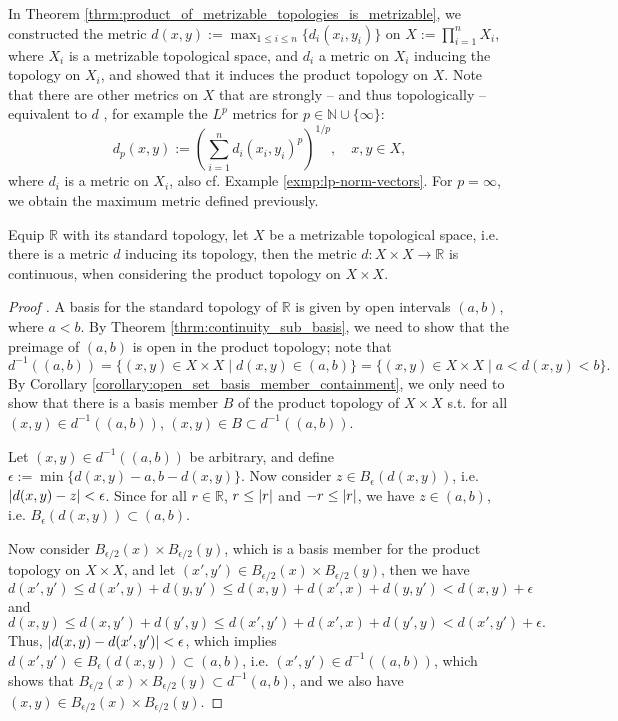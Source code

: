 \begin{remark}
	In Theorem \ref{thrm:product_of_metrizable_topologies_is_metrizable}, we constructed the metric $d(x, y) := \max_{1\leq i\leq n}\{d_i(x_i, y_i)\}$ on $X := \prod_{i=1}^{n}X_i$, where $X_i$ is a metrizable topological space, and $d_i$ a metric on $X_i$ inducing the topology on $X_i$, and showed that it induces the product topology on $X$. Note that there are other metrics on $X$ that are strongly -- and thus topologically -- equivalent to $d$ \cite{src:product_topology}, for example the $L^p$ metrics for $p\in \mathbb N\cup \{\infty\}$:
	$$d_p(x, y) := \left(\sum_{i=1}^{n}d_i(x_i, y_i)^p\right)^{1/p}, \quad x, y\in X,$$
	where $d_i$ is a metric on $X_i$, also cf. Example \ref{exmp:lp-norm-vectors}. For $p = \infty$, we obtain the maximum metric defined previously.
\end{remark}

\begin{theorem}
	Equip $\mathbb R$ with its standard topology, let $X$ be a metrizable topological space, i.e. there is a metric $d$ inducing its topology, then the metric $d: X\times X\to \mathbb R$ is continuous, when considering the product topology on $X\times X$.
\end{theorem}

\begin{proof}[Proof \cite{287313, 4228334}]
	A basis for the standard topology of $\mathbb R$ is given by open intervals $(a, b)$, where $a < b$. By Theorem \ref{thrm:continuity_sub_basis}, we need to show that the preimage of $(a, b)$ is open in the product topology; note that
	$$d^{-1}((a, b)) = \{(x, y)\in X\times X\mid d(x, y)\in (a, b)\} = \{(x, y)\in X\times X\mid a < d(x, y) < b\}.$$
	By Corollary \ref{corollary:open_set_basis_member_containment}, we only need to show that there is a basis member $B$ of the product topology of $X \times X$ s.t. for all $(x, y)\in d^{-1}((a, b))$, $(x, y)\in B\subset d^{-1}((a, b))$.
	
	Let $(x, y)\in d^{-1}((a, b))$ be arbitrary, and define $\epsilon := \min\{d(x, y) - a, b - d(x, y)\}$. Now consider $z\in B_{\epsilon}(d(x, y))$, i.e. $\left\vert d(x, y) - z \right\vert < \epsilon$. Since for all $r\in\mathbb R$, $r \leq \left\vert r \right\vert$ and $-r\leq \left\vert r \right\vert$, we have $z\in (a, b)$, i.e. $B_{\epsilon}(d(x, y))\subset (a, b)$.
	
	Now consider $B_{\epsilon/2}(x)\times B_{\epsilon/2}(y)$, which is a basis member for the product topology on $X\times X$, and let $(x', y')\in B_{\epsilon/2}(x)\times B_{\epsilon/2}(y)$, then we have
	$$d(x', y') \leq d(x', y) + d(y, y') \leq d(x, y) + d(x', x) + d(y, y') < d(x, y) + \epsilon$$
	and 
	$$d(x, y) \leq d(x, y') + d(y', y) \leq d(x', y') + d(x', x) + d(y', y) < d(x', y') + \epsilon.$$
	Thus, $\left\vert d(x, y)  - d(x', y') \right\vert < \epsilon$, which implies $d(x', y')\in B_{\epsilon}(d(x, y)) \subset (a, b)$, i.e. $(x', y')\in d^{-1}((a, b))$, which shows that $B_{\epsilon/2}(x)\times B_{\epsilon/2}(y) \subset d^{-1}(a, b)$, and we also have $(x, y)\in B_{\epsilon/2}(x)\times B_{\epsilon/2}(y)$.
	
	
\end{proof}

